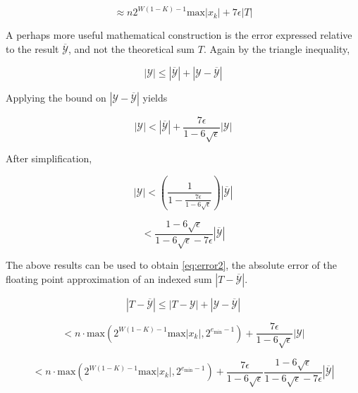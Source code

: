 \documentclass[12pt]{article}
\providecommand{\min}{\ensuremath{\text{min}}}
\providecommand{\max}{\ensuremath{\text{max}}}
\theoremstyle{definition}
\numberwithin{equation}{section}
\numberwithin{figure}{section}
\begin{document}
    \begin{equation}
    \approx n 2^{W  (1 - K) - 1} \max|x_k| + 7  \epsilon |T|
      \label{eq:errorapprox}
    \end{equation}

    A perhaps more useful mathematical construction is the error expressed relative to the result $\overline{\mathcal{Y}}$, and not the theoretical sum $T$. Again by the triangle inequality,

    \begin{equation*}
      |\mathcal{Y}| \leq |\overline{\mathcal{Y}}| + |\mathcal{Y} - \overline{\mathcal{Y}}|
    \end{equation*}

    Applying the bound on $|\mathcal{Y} - \overline{\mathcal{Y}}|$ yields

    \begin{equation*}
      |\mathcal{Y}| < |\overline{\mathcal{Y}}| + \frac{7\epsilon}{1 - 6\sqrt\epsilon}|\mathcal{Y}|
    \end{equation*}

    After simplification,

    \begin{equation*}
      |\mathcal{Y}| < (\frac{1}{1 - \frac{7\epsilon}{1 - 6\sqrt\epsilon}})  |\overline{\mathcal{Y}}|
    \end{equation*}

    \begin{equation*}
      < \frac{1 - 6 \sqrt\epsilon}{1 - 6 \sqrt \epsilon - 7\epsilon}  |\overline{\mathcal{Y}}|
    \end{equation*}

    The above results can be used to obtain  \eqref{eq:error2}, the absolute error of the floating point approximation of an indexed sum $|T - \overline{\mathcal{Y}}|$.

    \begin{equation*}
      |T - \overline{\mathcal{Y}}| \leq |T - \mathcal{Y}| + |\mathcal{Y} - \overline{\mathcal{Y}}|
    \end{equation*}

    \begin{equation*}
      < n \cdot \max(2^{W  (1 - K) - 1}  \max|x_k|, 2^{e_{\min} - 1}) + \frac{7\epsilon}{1 - 6\sqrt\epsilon}|\mathcal{Y}|
    \end{equation*}

    \begin{equation*}
      < n \cdot \max(2^{W  (1 - K) - 1}  \max|x_k|, 2^{e_{\min} - 1}) + \frac{7\epsilon}{1 - 6\sqrt\epsilon}\frac{1 - 6 \sqrt\epsilon}{1 - 6 \sqrt \epsilon - 7\epsilon}|\overline{\mathcal{Y}}|
    \end{equation*}
\end{document}
